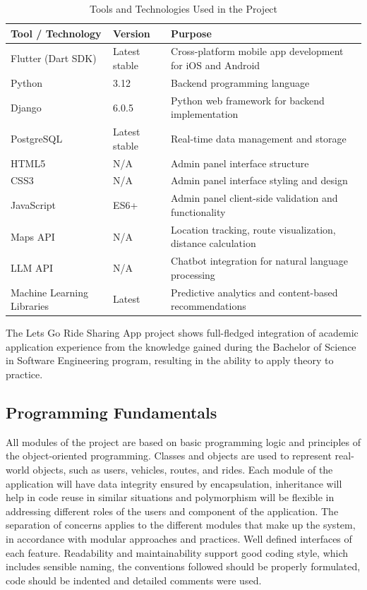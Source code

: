 \begin{table}[htbp]
\centering
\caption{Tools and Technologies Used in the Project}
\renewcommand{\arraystretch}{1.3}
\begin{tabularx}{\textwidth}{|p{4cm}|p{3cm}|X|}
\hline
\textbf{Tool / Technology} & \textbf{Version} & \textbf{Purpose} \\
\hline
Flutter (Dart SDK) & Latest stable & Cross-platform mobile app development for iOS and Android \\
\hline
Python & 3.12 & Backend programming language \\
\hline
Django & 6.0.5 & Python web framework for backend implementation \\
\hline
PostgreSQL & Latest stable & Real-time data management and storage \\
\hline
HTML5 & N/A & Admin panel interface structure \\
\hline
CSS3 & N/A & Admin panel interface styling and design \\
\hline
JavaScript & ES6+ & Admin panel client-side validation and functionality \\
\hline
Maps API & N/A & Location tracking, route visualization, distance calculation \\
\hline
LLM API & N/A & Chatbot integration for natural language processing \\
\hline
Machine Learning Libraries & Latest & Predictive analytics and content-based recommendations \\
\hline
\end{tabularx}
\end{table}



The Lets Go Ride Sharing App project shows full-fledged integration of academic application experience from the knowledge gained during the Bachelor of Science in Software Engineering program, resulting in the ability to apply theory to practice.

\subsection{Programming Fundamentals}

All modules of the project are based on basic programming logic and principles of the object-oriented programming. Classes and objects are used to represent real-world objects, such as users, vehicles, routes, and rides. Each module of the application will have data integrity ensured by encapsulation, inheritance will help in code reuse in similar situations and polymorphism will be flexible in addressing different roles of the users and component of the application. The separation of concerns applies to the different modules that make up the system, in accordance with modular approaches and practices. Well defined interfaces of each feature. Readability and maintainability support good coding style, which includes sensible naming, the conventions followed should be properly formulated, code should be indented and detailed comments were used.

